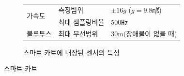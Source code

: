 \documentclass[12pt,a4paper]{article}
\begin{document}
\begin{itemize}
\begin{figure}[!h]
\begin{subfigure}[]{0.4\textwidth}
{\begin{tabular}{l l l}
                        \multirow{2}{*}{가속도} & 측정범위 &
                            $\pm16g$ ($g=9.8$㎨) \\
                        \cline{2-3}
                                                & 최대 샘플링비율 & 500㎐ \\
                        \hline
                        블루투스                & 최대 무선범위 &
                            30m(장애물이 없을 때) \\
                        \hline
                    \end{tabular}
                }
                \caption{\label{table1} 스마트 카트에 내장된 센서의 특성}
            \end{subfigure}
            \caption{\label{fig4} 스마트 카트}
        \end{figure}
\end{itemize}
\end{document}
